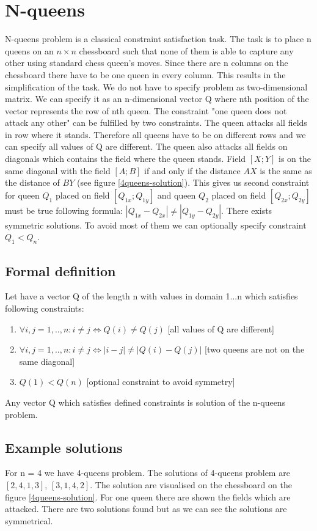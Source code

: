 \section{N-queens}
N-queens problem is a classical constraint satisfaction task. The task is to place n queens on an $n \times n$ chessboard such that none of them is able to capture any other using standard chess queen's moves. Since there are n columns on the chessboard there have to be one queen in every column. This results in the simplification of the task. We do not have to specify problem as two-dimensional matrix. We can specify it as an n-dimensional vector Q where nth position of the vector represents the row of nth queen. The constraint "one queen does not attack any other" can be fulfilled by two constraints. The queen attacks all fields in row where it stands. Therefore all queens have to be on different rows and we can specify all values of Q are different. The queen also attacks all fields on diagonals which contains the field where the queen stands. Field $[X ; Y]$ is on the same diagonal with the field $[A ; B]$ if and only if the distance $AX$ is the same as the distance of $BY$ (see figure \ref{4queens-solution}). This gives us second constraint for queen $Q_1$ placed on field $[Q_{1x};Q_{1y}]$ and queen $Q_2$ placed on field $[Q_{2x};Q_{2y}]$ must be true following formula: $|Q_{1x}-Q_{2x}| \neq |Q_{1y} - Q_{2y}|$. There exists symmetric solutions. To avoid most of them we can optionally specify constraint $Q_1 < Q_n$.

\subsection{Formal definition}
Let have a vector Q of the length n with values in domain 1...n which satisfies following constraints:

\begin{enumerate}
\item $\forall i,j=1,..,n: i \neq j \Leftrightarrow Q(i) \neq Q(j)$ [all values of Q are different]
\item $\forall i,j=1,..,n: i \neq j \Leftrightarrow  |i-j| \neq |Q(i) - Q(j)|$  [two queens are not on the same diagonal]
\item $Q(1) < Q(n)$  [optional constraint to avoid symmetry]
\end{enumerate}

Any vector Q which satisfies defined constraints is solution of the n-queens problem.

\subsection{Example solutions}
For n = 4 we have 4-queens problem. The solutions of 4-queens problem are $[2,4,1,3]$, $[3,1,4,2]$. The solution are visualised on the chessboard on the figure \ref{4queens-solution}. For one queen there are shown the fields which are attacked. There are two solutions found but as we can see the solutions are symmetrical.

